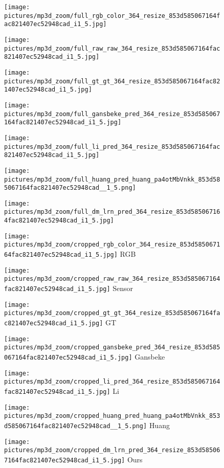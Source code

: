 \documentclass[final]{cvpr}
\begin{document}
\begin{figure*}[h]
        \begin{multicols}{7}
        \texttt{[image: pictures/mp3d\_zoom/full\_rgb\_color\_364\_resize\_853d585067164fac821407ec52948cad\_i1\_5.jpg]}\par
        \texttt{[image: pictures/mp3d\_zoom/full\_raw\_raw\_364\_resize\_853d585067164fac821407ec52948cad\_i1\_5.jpg]}\par 
        \texttt{[image: pictures/mp3d\_zoom/full\_gt\_gt\_364\_resize\_853d585067164fac821407ec52948cad\_i1\_5.jpg]}\par
        \texttt{[image: pictures/mp3d\_zoom/full\_gansbeke\_pred\_364\_resize\_853d585067164fac821407ec52948cad\_i1\_5.jpg]}\par
        \texttt{[image: pictures/mp3d\_zoom/full\_li\_pred\_364\_resize\_853d585067164fac821407ec52948cad\_i1\_5.jpg]}\par
        \texttt{[image: pictures/mp3d\_zoom/full\_huang\_pred\_huang\_pa4otMbVnkk\_853d585067164fac821407ec52948cad\_\_1\_5.png]}\par
        \texttt{[image: pictures/mp3d\_zoom/full\_dm\_lrn\_pred\_364\_resize\_853d585067164fac821407ec52948cad\_i1\_5.jpg]}\par
        \end{multicols}
    
        \begin{multicols}{7}
        \texttt{[image: pictures/mp3d\_zoom/cropped\_rgb\_color\_364\_resize\_853d585067164fac821407ec52948cad\_i1\_5.jpg]} \centering \small{RGB}\par
        \texttt{[image: pictures/mp3d\_zoom/cropped\_raw\_raw\_364\_resize\_853d585067164fac821407ec52948cad\_i1\_5.jpg]} \centering \small{Sensor}\par 
        \texttt{[image: pictures/mp3d\_zoom/cropped\_gt\_gt\_364\_resize\_853d585067164fac821407ec52948cad\_i1\_5.jpg]} \centering \small{GT}\par
        \texttt{[image: pictures/mp3d\_zoom/cropped\_gansbeke\_pred\_364\_resize\_853d585067164fac821407ec52948cad\_i1\_5.jpg]}\centering \small{ Gansbeke \etal}\par
        \texttt{[image: pictures/mp3d\_zoom/cropped\_li\_pred\_364\_resize\_853d585067164fac821407ec52948cad\_i1\_5.jpg]} \centering \small{ Li \etal}\par
        \texttt{[image: pictures/mp3d\_zoom/cropped\_huang\_pred\_huang\_pa4otMbVnkk\_853d585067164fac821407ec52948cad\_\_1\_5.png]} \centering \small{ Huang \etal}\par
        \texttt{[image: pictures/mp3d\_zoom/cropped\_dm\_lrn\_pred\_364\_resize\_853d585067164fac821407ec52948cad\_i1\_5.jpg]} \centering \small{ Ours}\par
        \end{multicols}
    

\end{figure*}
\end{document}
